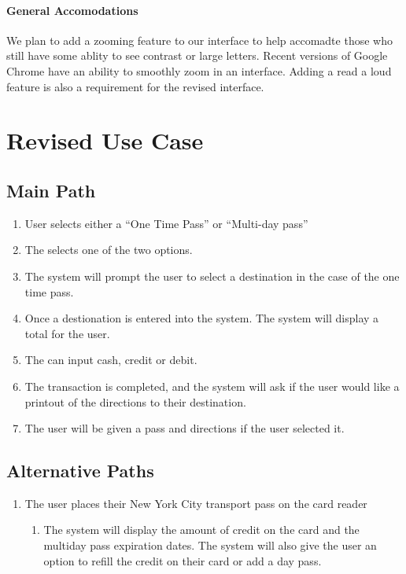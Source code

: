 \documentclass{article}
\begin{document}
            \paragraph{General Accomodations}
                We plan to add a zooming feature to our interface to help accomadte those who still have some ablity
                to see contrast or large letters. Recent versions of Google Chrome have an ability to smoothly zoom
                in an interface. Adding a read a loud feature is also a requirement for the revised interface.

    
    \section{Revised Use Case}
        \subsection{Main Path}
        \begin{enumerate}
            \item User selects either a ``One Time Pass'' or ``Multi-day pass''
            \item The selects one of the two options.
            \item The system will prompt the user to select a destination in the
            case of the one time pass.
            \item Once a destionation is entered into the system. The system will display
            a total for the user.
            \item The can input cash, credit or debit.
            \item The transaction is completed, and the system will ask if the user
            would like a printout of the directions to their destination.
            \item The user will be given a pass and directions if the user selected it. 
        \end{enumerate}

        \subsection{Alternative Paths}
            \begin{enumerate}
                \item The user places their New York City transport pass on the
                card reader 
                    \begin{enumerate}
                        \item The system will display the amount of credit on the card and the multiday 
                        pass expiration dates. The system will also give the user an option to refill the
                        credit on their card or add a day pass.
                    \end{enumerate}
            \end{enumerate}

    \newpage

     
    
\end{document}
